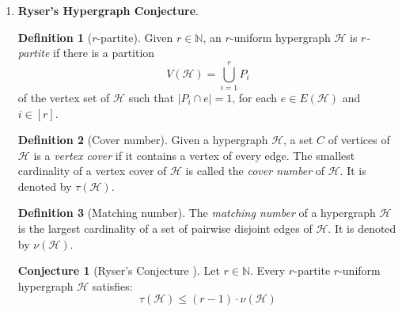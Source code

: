 \documentclass[12pt]{article}
\numberwithin{equation}{section}
\theoremstyle{definition}
\newtheorem{definition}{Definition}
\newtheorem{conjecture}[theorem]{Conjecture}
\newcommand{\ev}[1]{( #1 )}
\begin{document}
\begin{enumerate}
Here we are interested in the following scaled weakening of the original conjecture.

\begin{conjecture}[Scaled weakening of Rota's basis conjecture]
Let $r\in \mathbb{N}$.
Let $M$ be a finite matroid with a family $(B_1,..,B_n)$ of disjoint bases. 
There is $n_0\in \mathbb{N}$ so that for all $n\geq n_0$ and all $\epsilon\in \mathbb{R}_{>0}$, there is a family of disjoint bases $(C_1,..C_{\lceil (1-1/r-\epsilon) n\rceil})$ of $M$ so that $B_i\cap C_j$ is a singleton for all $i,j\in [n]$.
\end{conjecture}

Buci\'c, Kwan, Pokrovskiy and Sudakov proved the scaled weakening for $r=2$ \cite{bucic2020halfway}.

\newpage
\item \textbf{Ryser's Hypergraph Conjecture}.


\begin{definition}[$r$-partite]
Given $r\in \mathbb{N}$, an $r$-uniform hypergraph $\mathcal{H}$ is \emph{$r$-partite} if there is a partition
$$
V\ev{\mathcal{H}} = \bigcup_{i=1}^{r} P_i
$$
of the vertex set of $\mathcal{H}$ such that $|P_i \cap e| = 1$, for each $e\in E\ev{\mathcal{H}}$ and $i\in [r]$. 
\end{definition}


\begin{definition}[Cover number]
Given a hypergraph $\mathcal{H}$, a
set $C$ of vertices of $\mathcal{H}$ is a \textit{vertex cover} if it contains a vertex of every edge. The smallest cardinality of a vertex cover of $\mathcal{H}$ is called the \textit{cover number} of $\mathcal{H}$. It is denoted by $\tau(\mathcal{H})$.
\end{definition}

\begin{definition}[Matching number]
The \textit{matching number} of a hypergraph $\mathcal{H}$ is the largest cardinality of a set of pairwise disjoint edges of $\mathcal{H}$. It is denoted by $\nu\ev{\mathcal{H}}$.
\end{definition}

\begin{conjecture}[Ryser's Conjecture \mbox{\cite{bishnoi}}]
Let $r\in \mathbb{N}$.
Every $r$-partite $r$-uniform hypergraph $\mathcal{H}$ satisfies:
$$
\tau\ev{\mathcal{H}} \leq \ev{r-1} \cdot \nu\ev{\mathcal{H}}
$$

\end{conjecture}


\end{enumerate}
\end{document}
